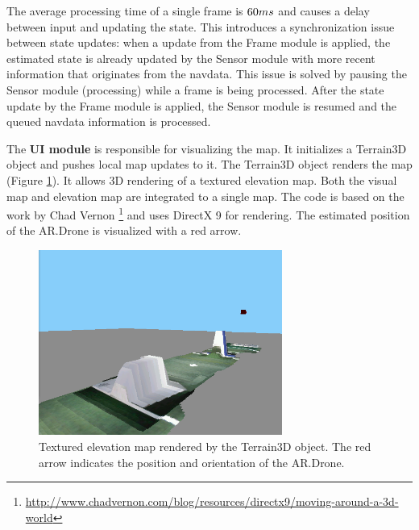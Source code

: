 The average processing time of a single frame is $60 \small{ms}$ and causes a delay between input and updating the state.
This introduces a synchronization issue between state updates: when a update from the Frame module is applied, the estimated state is already updated by the Sensor module with more recent information that originates from the navdata.
This issue is solved by pausing the Sensor module (processing) while a frame is being processed.
After the state update by the Frame module is applied, the Sensor module is resumed and the queued navdata information is processed.

The \textbf{UI module} is responsible for visualizing the map.
It initializes a Terrain3D object and pushes local map updates to it.
The Terrain3D object renders the map (Figure \ref{fig:terrain3d_map}).
It allows 3D rendering of a textured elevation map.
Both the visual map and elevation map are integrated to a single map.
The code is based on the work by Chad Vernon \footnote{\url{http://www.chadvernon.com/blog/resources/directx9/moving-around-a-3d-world}} and uses DirectX 9 for rendering.
The estimated position of the AR.Drone is visualized with a red arrow.
\begin{figure}[htb!]
\centering
\includegraphics[width=8cm]{images/terrain3d.png}
\caption{Textured elevation map rendered by the Terrain3D object. The red arrow indicates the position and orientation of the AR.Drone.} 
\label{fig:terrain3d_map}
\end{figure}